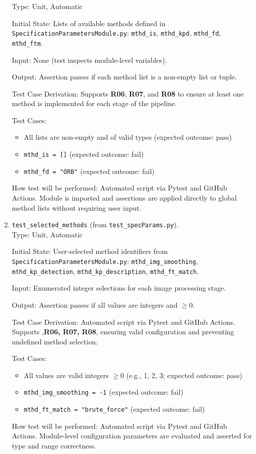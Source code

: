 \documentclass[12pt, titlepage]{article}
\begin{document}
\begin{enumerate}
  Type: Unit, Automatic

  Initial State: Lists of available methods defined in \texttt{SpecificationParametersModule.py}:
  \texttt{mthd\_is}, \texttt{mthd\_kpd}, \texttt{mthd\_fd}, \texttt{mthd\_ftm}.

  Input: None (test inspects module-level variables).

  Output: Assertion passes if each method list is a non-empty list or tuple.

  Test Case Derivation: Supports \textbf{R06}, \textbf{R07}, and \textbf{R08} to ensure at least one method is implemented for each stage of the pipeline.

  Test Cases:
  \begin{itemize}
    \item All lists are non-empty and of valid types (expected outcome: pass)
    \item \texttt{mthd\_is = []} (expected outcome: fail)
    \item \texttt{mthd\_fd = "ORB"} (expected outcome: fail)
  \end{itemize}

  How test will be performed: Automated script via Pytest and GitHub Actions. Module is imported and assertions are applied directly to global method lists without requiring user input.

  \item \texttt{test\_selected\_methods} \textnormal{(from \texttt{test\_specParams.py})}. \\

  Type: Unit, Automatic

  Initial State: User-selected method identifiers from \texttt{SpecificationParametersModule.py}:
  \texttt{mthd\_img\_smoothing}, \texttt{mthd\_kp\_detection}, \texttt{mthd\_kp\_description}, \texttt{mthd\_ft\_match}.

  Input: Enumerated integer selections for each image processing stage.

  Output: Assertion passes if all values are integers and \(\geq 0\).

  Test Case Derivation: Automated script via Pytest and GitHub Actions. Supports ,\textbf{R06, R07, R08}, ensuring valid configuration and preventing undefined method selection.

  Test Cases:
  \begin{itemize}
    \item All values are valid integers \(\geq 0\) (e.g., 1, 2, 3; expected outcome: pass)
    \item \texttt{mthd\_img\_smoothing = -1} (expected outcome: fail)
    \item \texttt{mthd\_ft\_match = "brute\_force"} (expected outcome: fail)
  \end{itemize}

  How test will be performed: Automated script via Pytest and GitHub Actions. Module-level configuration parameters are evaluated and asserted for type and range correctness.
\end{enumerate}
\end{document}

